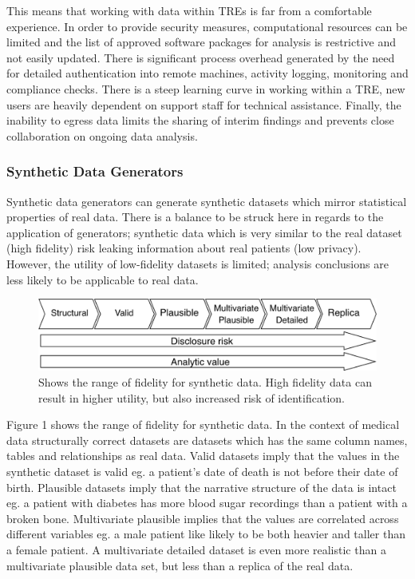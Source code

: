\documentclass[11pt]{article}
\begin{document}
This means that working with data within TREs is far from a comfortable experience. In order to provide security measures, computational resources can be limited and the list of approved software packages for analysis is restrictive and not easily updated. There is significant process overhead generated by the need for detailed authentication into remote machines, activity logging, monitoring and compliance checks. There is a steep learning curve in working within a TRE, new users are heavily dependent on support staff for technical assistance. Finally, the inability to egress data limits the sharing of interim findings and prevents close collaboration on ongoing data analysis. 

\subsubsection{Synthetic Data Generators}

Synthetic data generators can generate synthetic datasets which mirror statistical properties of real data. There is a balance to be struck here in regards to the application of generators; synthetic data which is very similar to the real dataset (high fidelity) risk leaking information about real patients (low privacy). However, the utility of low-fidelity datasets is limited; analysis conclusions are less likely to be applicable to real data.

\begin{figure}[ht]
\centering
\includegraphics[width=0.8\linewidth]{figures/ONS.png}
\caption{Shows the range of fidelity for synthetic data. High fidelity data can result in higher utility, but also increased risk of identification.}
\label{fig:Range of fidelity for synthetic data}
\end{figure}

Figure 1 shows the range of fidelity for synthetic data. In the context of medical data structurally correct datasets are datasets which has the same column names, tables and relationships as real data. Valid datasets imply that the values in the synthetic dataset is valid eg. a patient's date of death is not before their date of birth. Plausible datasets imply that the narrative structure of the data is intact eg. a patient with diabetes has more blood sugar recordings than a patient with a broken bone. Multivariate plausible implies that the values are correlated across different variables eg. a male patient like likely to be both heavier and taller than a female patient. A multivariate detailed dataset is even more realistic than a multivariate plausible data set, but less than a replica of the real data. 
\end{document}
